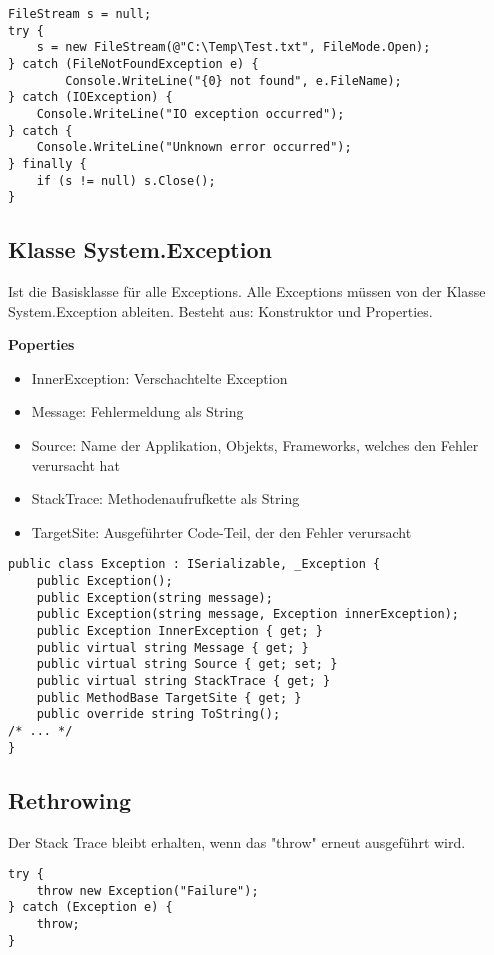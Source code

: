 \begin{lstlisting}
FileStream s = null; 
try {
	s = new FileStream(@"C:\Temp\Test.txt", FileMode.Open);
} catch (FileNotFoundException e) {
		Console.WriteLine("{0} not found", e.FileName);
} catch (IOException) {
	Console.WriteLine("IO exception occurred");
} catch {
	Console.WriteLine("Unknown error occurred");
} finally {
	if (s != null) s.Close();
}
\end{lstlisting}

\subsection{Klasse System.Exception}
Ist die Basisklasse für alle Exceptions. Alle Exceptions müssen von der Klasse System.Exception ableiten. Besteht aus: Konstruktor und Properties. 

\textbf{Poperties}
\begin{itemize}
  \itemsep -0.5em 
  \item InnerException: Verschachtelte Exception
  \item Message: Fehlermeldung als String
  \item Source: Name der Applikation, Objekts, Frameworks, welches den Fehler verursacht hat
  \item StackTrace: Methodenaufrufkette als String
  \item TargetSite: Ausgeführter Code-Teil, der den Fehler verursacht
\end{itemize}


\begin{lstlisting}
public class Exception : ISerializable, _Exception {
	public Exception(); 
	public Exception(string message); 
	public Exception(string message, Exception innerException);
	public Exception InnerException { get; } 
	public virtual string Message { get; } 
	public virtual string Source { get; set; } 
	public virtual string StackTrace { get; } 
	public MethodBase TargetSite { get; }
	public override string ToString();
/* ... */
}
\end{lstlisting}

\subsection{Rethrowing}
Der Stack Trace bleibt erhalten, wenn das "throw" erneut ausgeführt wird.
\begin{lstlisting}
try {
	throw new Exception("Failure");
} catch (Exception e) {
	throw;
}
\end{lstlisting}

